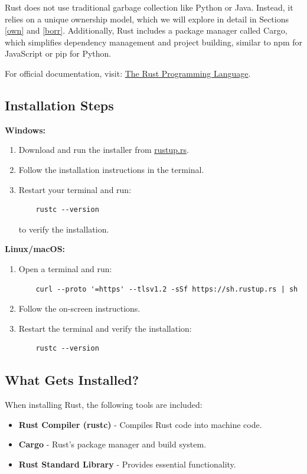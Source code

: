 \documentclass[a4paper,12pt]{report}
\begin{document}
		\noindent Rust does not use traditional garbage collection like Python or Java. Instead, it relies on a unique ownership model, which we will explore in detail in Sections \ref{own} and \ref{borr}. Additionally, Rust includes a package manager called Cargo, which simplifies dependency management and project building, similar to npm for JavaScript or pip for Python.
	
		\noindent For official documentation, visit: \href{https://doc.rust-lang.org/book/}{The Rust Programming Language}.
	
	
	\subsection*{Installation Steps}
	\textbf{Windows:}
	\begin{enumerate}
		\item Download and run the installer from \href{https://rustup.rs/}{rustup.rs}.
		\item Follow the installation instructions in the terminal.
		\item Restart your terminal and run:
		\begin{lstlisting}
	rustc --version
		\end{lstlisting}
		to verify the installation.
	\end{enumerate}
	
	\textbf{Linux/macOS:}
	\begin{enumerate}
		\item Open a terminal and run:
		\begin{lstlisting}
	curl --proto '=https' --tlsv1.2 -sSf https://sh.rustup.rs | sh
		\end{lstlisting}
		\item Follow the on-screen instructions.
		\item Restart the terminal and verify the installation:
		\begin{lstlisting}
	rustc --version
		\end{lstlisting}
	\end{enumerate}
	
	\subsection*{What Gets Installed?}
	When installing Rust, the following tools are included:
	\begin{itemize}
		\item \textbf{Rust Compiler (rustc)} - Compiles Rust code into machine code.
		\item \textbf{Cargo} - Rust’s package manager and build system.
		\item \textbf{Rust Standard Library} - Provides essential functionality.
	\end{itemize}
	
\end{document}
